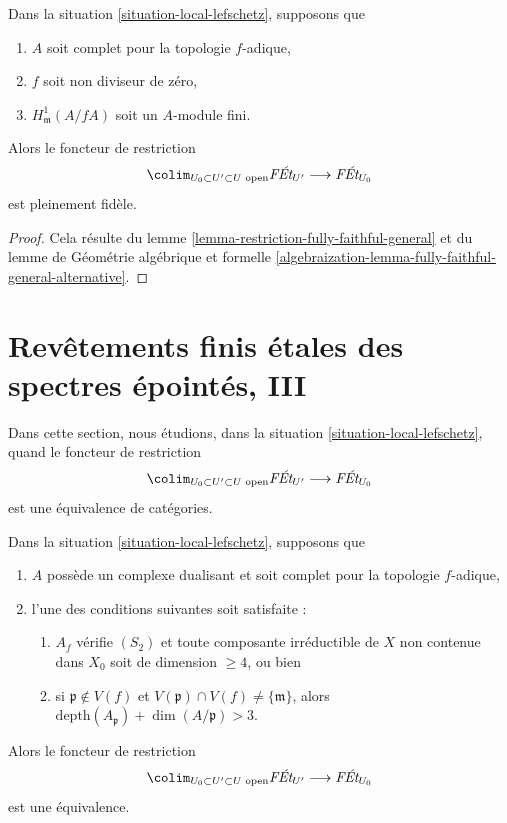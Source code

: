 \begin{lemma}
\label{lemma-fully-faithful-general}
Dans la situation \ref{situation-local-lefschetz}, supposons que
\begin{enumerate}
\item $A$ soit complet pour la topologie $f$-adique,
\item $f$ soit non diviseur de zéro,
\item $H^1_\mathfrak m(A/fA)$ soit un $A$-module fini.
\end{enumerate}
Alors le foncteur de restriction
$$
\colim_{U_0 \subset U' \subset U\text{ open}} \textit{F\'Et}_{U'}
\longrightarrow
\textit{F\'Et}_{U_0}
$$
est pleinement fidèle.
\end{lemma}

\begin{proof}
Cela résulte du
lemme \ref{lemma-restriction-fully-faithful-general} et du
lemme de Géométrie algébrique et formelle
\ref{algebraization-lemma-fully-faithful-general-alternative}.
\end{proof}








\section{Revêtements finis étales des spectres épointés, III}
\label{section-pi1-punctured-spec-III}

\noindent
Dans cette section, nous étudions, dans la situation \ref{situation-local-lefschetz}, quand
le foncteur de restriction
$$
\colim_{U_0 \subset U' \subset U\text{ open}} \textit{F\'Et}_{U'}
\longrightarrow
\textit{F\'Et}_{U_0}
$$
est une équivalence de catégories.

\begin{lemma}
\label{lemma-essentially-surjective-general-better}
Dans la situation \ref{situation-local-lefschetz}, supposons que
\begin{enumerate}
\item $A$ possède un complexe dualisant et soit complet pour la topologie $f$-adique,
\item l'une des conditions suivantes soit satisfaite :
\begin{enumerate}
\item $A_f$ vérifie $(S_2)$ et toute composante irréductible de $X$
non contenue dans $X_0$ soit de dimension $\geq 4$, ou bien
\item si $\mathfrak p \not \in V(f)$ et
$V(\mathfrak p) \cap V(f) \not = \{\mathfrak m\}$, alors
$\text{depth}(A_\mathfrak p) + \dim(A/\mathfrak p) > 3$.
\end{enumerate}
\end{enumerate}
Alors le foncteur de restriction
$$
\colim_{U_0 \subset U' \subset U\text{ open}} \textit{F\'Et}_{U'}
\longrightarrow
\textit{F\'Et}_{U_0}
$$
est une équivalence.
\end{lemma}

